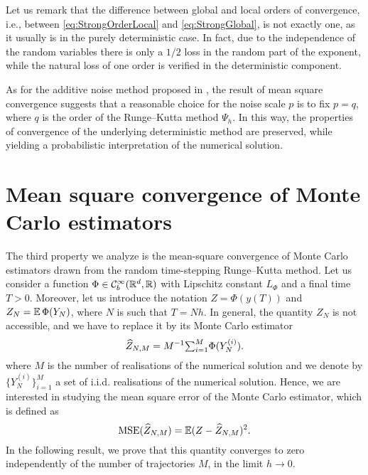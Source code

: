 \documentclass[10pt]{article}
\begin{document}
\begin{remark} Let us remark that the difference between global and local orders of convergence, i.e., between \eqref{eq:StrongOrderLocal} and \eqref{eq:StrongGlobal}, is not exactly one, as it usually is in the purely deterministic case. In fact, due to the independence of the random variables there is only a $1/2$ loss in the random part of the exponent, while the natural loss of one order is verified in the deterministic component.
\end{remark}
\begin{remark} As for the additive noise method proposed in \cite{CGS17}, the result of mean square convergence suggests that a reasonable choice for the noise scale $p$ is to fix $p=q$, where $q$ is the order of the Runge--Kutta method $\Psi_h$. In this way, the properties of convergence of the underlying deterministic method are preserved, while yielding a probabilistic interpretation of the numerical solution.
\end{remark}

\section{Mean square convergence of Monte Carlo estimators}\label{sec:MonteCarlo}

The third property we analyze is the mean-square convergence of Monte Carlo estimators drawn from the random time-stepping Runge--Kutta method. Let us consider a function $\Phi\in\mathcal{C}^\infty_b(\mathbb{R}^d, \mathbb{R})$ with Lipschitz constant $L_\Phi$ and a final time $T > 0$. Moreover, let us introduce the notation $Z = \Phi(y(T))$ and $Z_N = \operatorname{\mathbb{E}}\Phi(Y_N)$, where $N$ is such that $T = Nh$. In general, the quantity $Z_N$ is not accessible, and we have to replace it by its Monte Carlo estimator 
\begin{equation}\label{eq:MSE}
	\widehat Z_{N, M} = M^{-1} {\textstyle\sum}_{i = 1}^M \Phi(Y_N^{(i)}).
\end{equation}
where $M$ is the number of realisations of the numerical solution and we denote by $\{Y_N^{(i)}\}_{i=1}^M$ a set of i.i.d. realisations of the numerical solution. Hence, we are interested in studying the mean square error of the Monte Carlo estimator, which is defined as
\begin{equation}
	\operatorname{MSE}(\widehat Z_{N, M}) = \operatorname{\mathbb{E}}(Z - \widehat Z_{N, M})^2.
\end{equation}
In the following result, we prove that this quantity converges to zero independently of the number of trajectories $M$, in the limit $h \to 0$.
\end{document}
